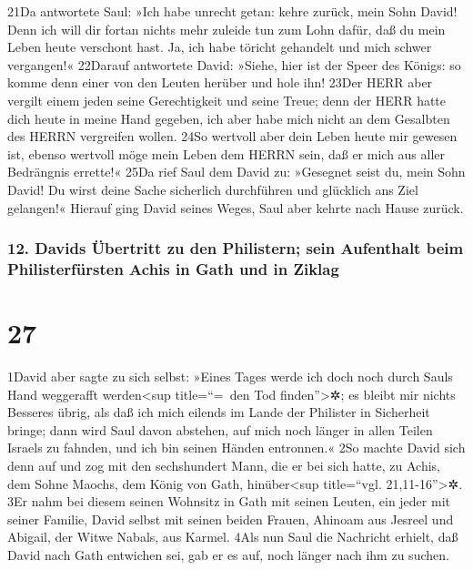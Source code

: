 21Da antwortete Saul: »Ich habe unrecht getan: kehre zurück, mein Sohn
David! Denn ich will dir fortan nichts mehr zuleide tun zum Lohn dafür,
daß du mein Leben heute verschont hast. Ja, ich habe töricht gehandelt
und mich schwer vergangen!« 22Darauf antwortete David: »Siehe, hier ist
der Speer des Königs: so komme denn einer von den Leuten herüber und
hole ihn! 23Der HERR aber vergilt einem jeden seine Gerechtigkeit und
seine Treue; denn der HERR hatte dich heute in meine Hand gegeben, ich
aber habe mich nicht an dem Gesalbten des HERRN vergreifen wollen. 24So
wertvoll aber dein Leben heute mir gewesen ist, ebenso wertvoll möge
mein Leben dem HERRN sein, daß er mich aus aller Bedrängnis errette!«
25Da rief Saul dem David zu: »Gesegnet seist du, mein Sohn David! Du
wirst deine Sache sicherlich durchführen und glücklich ans Ziel
gelangen!« Hierauf ging David seines Weges, Saul aber kehrte nach Hause
zurück.

\hypertarget{davids-uxfcbertritt-zu-den-philistern-sein-aufenthalt-beim-philisterfuxfcrsten-achis-in-gath-und-in-ziklag}{%
\subsubsection{12. Davids Übertritt zu den Philistern; sein Aufenthalt
beim Philisterfürsten Achis in Gath und in
Ziklag}\label{davids-uxfcbertritt-zu-den-philistern-sein-aufenthalt-beim-philisterfuxfcrsten-achis-in-gath-und-in-ziklag}}

\hypertarget{section-26}{%
\section{27}\label{section-26}}

1David aber sagte zu sich selbst: »Eines Tages werde ich doch noch durch
Sauls Hand weggerafft werden\textless sup title=``=~den Tod
finden''\textgreater✲; es bleibt mir nichts Besseres übrig, als daß ich
mich eilends im Lande der Philister in Sicherheit bringe; dann wird Saul
davon abstehen, auf mich noch länger in allen Teilen Israels zu fahnden,
und ich bin seinen Händen entronnen.« 2So machte David sich denn auf und
zog mit den sechshundert Mann, die er bei sich hatte, zu Achis, dem
Sohne Maochs, dem König von Gath, hinüber\textless sup title=``vgl.
21,11-16''\textgreater✲. 3Er nahm bei diesem seinen Wohnsitz in Gath mit
seinen Leuten, ein jeder mit seiner Familie, David selbst mit seinen
beiden Frauen, Ahinoam aus Jesreel und Abigail, der Witwe Nabals, aus
Karmel. 4Als nun Saul die Nachricht erhielt, daß David nach Gath
entwichen sei, gab er es auf, noch länger nach ihm zu suchen.

